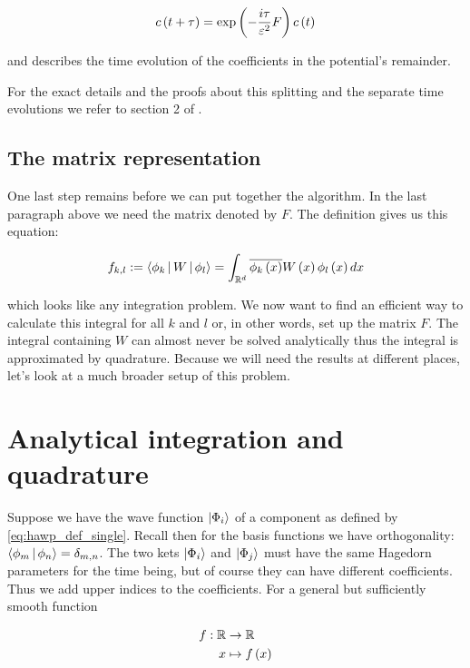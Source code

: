 \begin{equation} \label{eq:splitting_prop_remainder}
  c\left( t+\tau \right) = \exp\left( -\frac{i\tau}{\varepsilon^2}F \right) c\left( t \right)
\end{equation}

and describes the time evolution of the coefficients in the potential's remainder.

For the exact details and the proofs about this splitting and the separate
time evolutions we refer to section 2 of \cite{FGL_semiclassical_dynamics}.

\subsection{The matrix representation}

One last step remains before we can put together the algorithm. In the last paragraph
above we need the matrix denoted by $F$. The definition gives us this equation:

\begin{equation} \label{eq:the_matrix_f}
  f_{k,l} := \Braket{\phi_k | W | \phi_l} = \int_{\mathbb{R}^d} \overline{\phi_k\left( x \right)} W\left( x \right) \phi_l\left( x \right) dx
\end{equation}

which looks like any integration problem. We now want to find an efficient way to calculate this
integral for all $k$ and $l$ or, in other words, set up the matrix $F$. The integral containing
$W$ can almost never be solved analytically thus the integral is approximated by quadrature. Because
we will need the results at different places, let's look at a much broader setup of this problem.

\section{Analytical integration and quadrature}

Suppose we have the wave function $\Ket{\Phi_i}$ of a component as defined by \eqref{eq:hawp_def_single}.
Recall then for the basis functions we have orthogonality: $\Braket{\phi_m | \phi_n } = \delta_{m,n}$. The
two kets $\Ket{\Phi_i}$ and $\Ket{\Phi_j}$ must have the same Hagedorn parameters
for the time being, but of course they can have different coefficients. Thus we add
upper indices to the coefficients. For a general but sufficiently smooth function

\begin{align*}
  f : \mathbb{R} & \rightarrow \mathbb{R} \\
               x & \mapsto f \left( x \right)
\end{align*}

